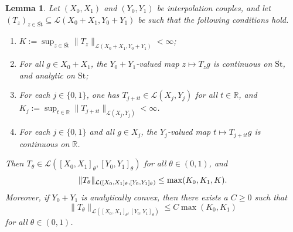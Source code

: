 \documentclass{amsart}
\newcommand {\La}{\mathcal{L}}
\newcommand {\R}{\mathbb R}
\newcommand {\St}{{\mathrm{St}}}
\newtheorem{lemma}[theorem]{Lemma}
\theoremstyle{definition}
\numberwithin{equation}{section}
\begin{document}
\begin{lemma}\label{lem:Steininter}
Let $(X_{0},X_{1})$ and $(Y_{0},Y_{1})$ be interpolation couples, and let %
$(T_{z})_{z\in\overline{\St}}\subseteq\La(X_{0}+X_{1},Y_{0}+Y_{1})$ be such that the following conditions hold.
\begin{enumerate}
\item\label{it:Steininter1} $K:=\sup_{z\in\overline{\St}}\|T_{z}\|_{\La(X_{0}+X_{1},Y_{0}+Y_{1})}<\infty$;
\item\label{it:Steininter2} For all $g\in X_{0}+X_{1}$, the $Y_{0}+Y_{1}$-valued map $z\mapsto T_{z}g$ is continuous on $\overline{\St}$, and analytic on $\St$;
\item\label{it:Steininter3} For each $j\in\{0,1\}$, one has $T_{j+it}\in\La(X_{j},Y_{j})$ for all $t\in\R$, and $K_{j}:=\sup_{t\in\R}\|T_{j+it}\|_{\La(X_{j},Y_{j})}<\infty$.
\item\label{it:Steininter4} For each $j\in\{0,1\}$ and all $g\in X_{j}$, the $Y_{j}$-valued map $t\mapsto T_{j+it}g$ is continuous on $\R$.
\end{enumerate}
Then $T_{\theta}\in \La([X_{0},X_{1}]_{\theta},[Y_{0},Y_{1}]_{\theta})$ for all $\theta\in(0,1)$, and 
\begin{equation}\label{eq:Steininter1}
\|T_{\theta}\|_{\La([X_{0},X_{1}]_{\theta},[Y_{0},Y_{1}]_{\theta})}\\
\leq \max(K_{0},K_{1},K).
\end{equation}
Moreover, if $Y_{0}+Y_{1}$ is analytically convex, then there exists a $C\geq0$ such that
\begin{equation}\label{eq:Steininter2}
\|T_{\theta}\|_{\La([X_{0},X_{1}]_{\theta},[Y_{0},Y_{1}]_{\theta})}\leq C\max(K_{0},K_{1})
\end{equation}
for all $\theta\in(0,1)$.
\end{lemma}
\end{document}
